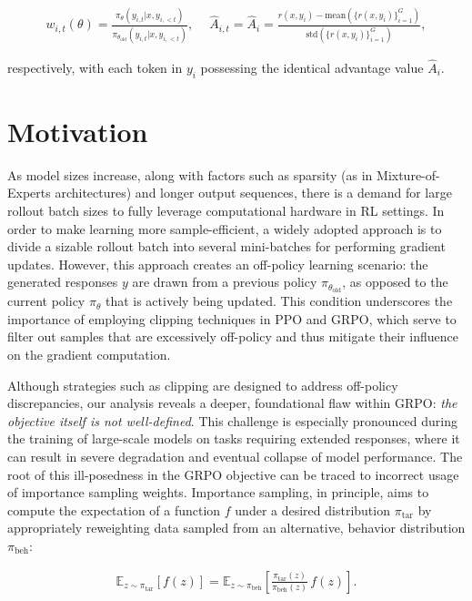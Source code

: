 \begin{align}
    w_{i,t}(\theta)=\frac{ \pi_{\theta} (y_{i,t} | x, y_{i,<t}) }{ \pi_{\theta_\text{old}} (y_{i,t} | x,y_{i,<t})},\quad\ 
    \widehat{A}_{i,t} = \widehat{A}_{i} = \frac{r(x, y_i) - \mathrm{mean} \left( \{ r(x, y_i) \}_{i=1}^G \right) }{ \mathrm{std} \left( \{ r(x, y_i) \}_{i=1}^G \right) },
\end{align}

respectively, with each token in $y_i$ possessing the identical advantage value $\widehat{A}_{i}$.

\section{Motivation}
\label{sec:motivation}

As model sizes increase, along with factors such as sparsity (as in Mixture-of-Experts architectures) and longer output sequences, there is a demand for large rollout batch sizes to fully leverage computational hardware in RL settings. In order to make learning more sample-efficient, a widely adopted approach is to divide a sizable rollout batch into several mini-batches for performing gradient updates. However, this approach creates an off-policy learning scenario: the generated responses $y$ are drawn from a previous policy $\pi_{\theta_\text{old}}$, as opposed to the current policy $\pi_\theta$ that is actively being updated. This condition underscores the importance of employing clipping techniques in PPO and GRPO, which serve to filter out samples that are excessively off-policy and thus mitigate their influence on the gradient computation.

Although strategies such as clipping are designed to address off-policy discrepancies, our analysis reveals a deeper, foundational flaw within GRPO: \textit{the objective itself is not well-defined}. This challenge is especially pronounced during the training of large-scale models on tasks requiring extended responses, where it can result in severe degradation and eventual collapse of model performance. The root of this ill-posedness in the GRPO objective can be traced to incorrect usage of importance sampling weights. Importance sampling, in principle, aims to compute the expectation of a function $f$ under a desired distribution $\pi_\text{tar}$ by appropriately reweighting data sampled from an alternative, behavior distribution $\pi_\text{beh}$:

\begin{align}
\mathbb{E}_{z \sim \pi_\text{tar}} \left[ f(z) \right] = \mathbb{E}_{z \sim \pi_\text{beh}} \left[ \frac{ \pi_\text{tar} (z) }{ \pi_\text{beh} (z)} \, f(z) \right].
\end{align}

